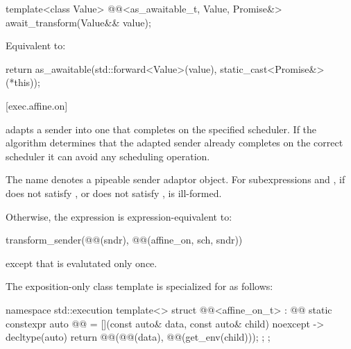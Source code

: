 %
\begin{itemdecl}
template<class Value>
@@<as_awaitable_t, Value, Promise&> await_transform(Value&& value);
\end{itemdecl}

\begin{itemdescr}
\pnum
\effects
Equivalent to:
\begin{codeblock}
return as_awaitable(std::forward<Value>(value), static_cast<Promise&>(*this));
\end{codeblock}
\end{itemdescr}

[exec.affine.on]{}

\pnum
{} adapts a sender into one that completes on
the specified scheduler.
If the algorithm determines that the adapted sender already completes
on the correct scheduler it can avoid any scheduling operation.

\pnum
The name  denotes a pipeable sender adaptor
object.
For subexpressions  and , if 
does not satisfy , or 
does not satisfy , 
is ill-formed.

\pnum
Otherwise, the expression  is
expression-equivalent to:
\begin{codeblock}
transform_sender(@@(sndr), @@(affine_on, sch, sndr))
\end{codeblock}
except that  is evalutated only once.

\pnum
The exposition-only class template 
is specialized for  as follows:

\begin{codeblock}
namespace std::execution {
  template<>
  struct @@<affine_on_t> : @@ {
    static constexpr auto @@ =
      [](const auto& data, const auto& child) noexcept -> decltype(auto) {
        return @@(@@(data), @@(get_env(child)));
      };
  };
}
\end{codeblock}

